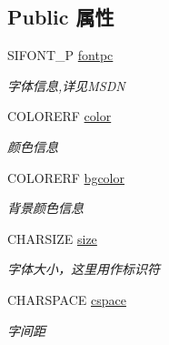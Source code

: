 \subsection*{Public 属性}
\begin{DoxyCompactItemize}
\item 
S\+I\+F\+O\+N\+T\+\_\+P \hyperlink{class_s_i_c_h_a_r___i_n_f_o_a8d998c494943882d98981f79f620460d}{fontpc}
\begin{DoxyCompactList}\small\item\em 字体信息,详见\+M\+S\+DN \end{DoxyCompactList}\item 
\mbox{\label{class_s_i_c_h_a_r___i_n_f_o_ab9605aad10f9e033ed8e004468beeab9}} 
C\+O\+L\+O\+R\+E\+RF \hyperlink{class_s_i_c_h_a_r___i_n_f_o_ab9605aad10f9e033ed8e004468beeab9}{color}
\begin{DoxyCompactList}\small\item\em 颜色信息  \end{DoxyCompactList}\item 
\mbox{\label{class_s_i_c_h_a_r___i_n_f_o_a838a052749c0c04c6f20c633b1cc4432}} 
C\+O\+L\+O\+R\+E\+RF \hyperlink{class_s_i_c_h_a_r___i_n_f_o_a838a052749c0c04c6f20c633b1cc4432}{bgcolor}
\begin{DoxyCompactList}\small\item\em 背景颜色信息  \end{DoxyCompactList}\item 
\mbox{\label{class_s_i_c_h_a_r___i_n_f_o_abcc72d98471148d54e334f9528103a50}} 
C\+H\+A\+R\+S\+I\+ZE \hyperlink{class_s_i_c_h_a_r___i_n_f_o_abcc72d98471148d54e334f9528103a50}{size}
\begin{DoxyCompactList}\small\item\em 字体大小，这里用作标识符  \end{DoxyCompactList}\item 
\mbox{\label{class_s_i_c_h_a_r___i_n_f_o_a575d876eda778563dec0f72bd4bc06ea}} 
C\+H\+A\+R\+S\+P\+A\+CE \hyperlink{class_s_i_c_h_a_r___i_n_f_o_a575d876eda778563dec0f72bd4bc06ea}{cspace}
\begin{DoxyCompactList}\small\item\em 字间距  \end{DoxyCompactList}\item 

\end{DoxyCompactItemize}
